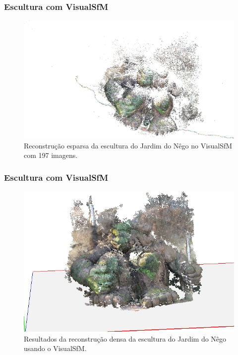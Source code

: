 \documentclass[table, usenames, svgnames, xcolor=dvipsnames]{beamer}
\begin{document}
\begin{frame}
\frametitle{\textbf{Escultura com VisualSfM}}
	\begin{figure}[!h]
		\centering
		\includegraphics[width=0.9\linewidth]{figs/guerreiroEsparsa.jpg}
		\caption{%
		Reconstrução esparsa da escultura do Jardim do Nêgo no VisualSfM com 197 imagens.
		}\label{fig:reconstrucaoEsparsaIndioVisualSFM}
	\end{figure}
\end{frame}

\begin{frame}
\frametitle{\textbf{Escultura com VisualSfM}}
	\begin{figure}[!h]
		\centering
		\includegraphics[width=0.75\linewidth]{figs/guerreirovisualsfmdmr.jpg}
		\caption{%
		Resultados da reconstrução densa da escultura do Jardim do Nêgo usando o VisualSfM.
		}\label{fig:reconstrucaoDensaIndioVisualSFM}
	\end{figure}
\end{frame}
\end{document}
